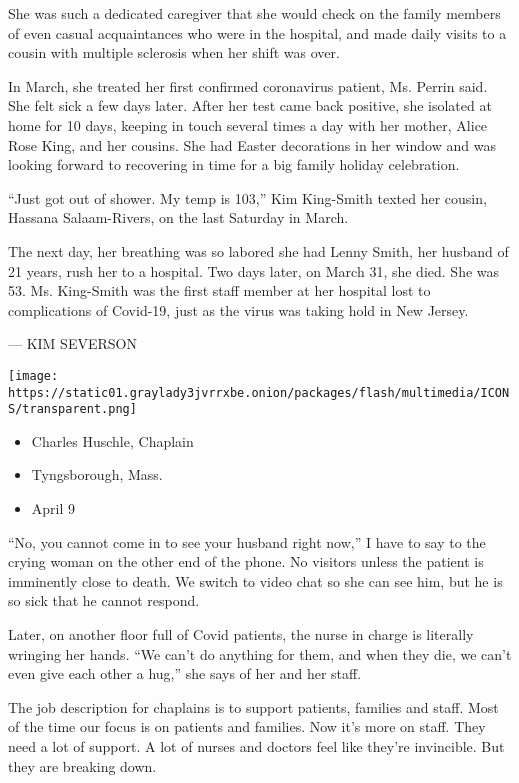 She was such a dedicated caregiver that she would check on the family
members of even casual acquaintances who were in the hospital, and made
daily visits to a cousin with multiple sclerosis when her shift was
over.

In March, she treated her first confirmed coronavirus patient, Ms.
Perrin said. She felt sick a few days later. After her test came back
positive, she isolated at home for 10 days, keeping in touch several
times a day with her mother, Alice Rose King, and her cousins. She had
Easter decorations in her window and was looking forward to recovering
in time for a big family holiday celebration.

``Just got out of shower. My temp is 103,'' Kim King-Smith texted her
cousin, Hassana Salaam-Rivers, on the last Saturday in March.

The next day, her breathing was so labored she had Lenny Smith, her
husband of 21 years, rush her to a hospital. Two days later, on March
31, she died. She was 53. Ms. King-Smith was the first staff member at
her hospital lost to complications of Covid-19, just as the virus was
taking hold in New Jersey.

--- KIM SEVERSON

\texttt{[image: https://static01.graylady3jvrrxbe.onion/packages/flash/multimedia/ICONS/transparent.png]}

\begin{itemize}
\tightlist
\item
  Charles Huschle, Chaplain
\item
  Tyngsborough, Mass.
\item
  April 9
\end{itemize}

``No, you cannot come in to see your husband right now,'' I have to say
to the crying woman on the other end of the phone. No visitors unless
the patient is imminently close to death. We switch to video chat so she
can see him, but he is so sick that he cannot respond.

Later, on another floor full of Covid patients, the nurse in charge is
literally wringing her hands. ``We can't do anything for them, and when
they die, we can't even give each other a hug,'' she says of her and her
staff.

The job description for chaplains is to support patients, families and
staff. Most of the time our focus is on patients and families. Now it's
more on staff. They need a lot of support. A lot of nurses and doctors
feel like they're invincible. But they are breaking down.

